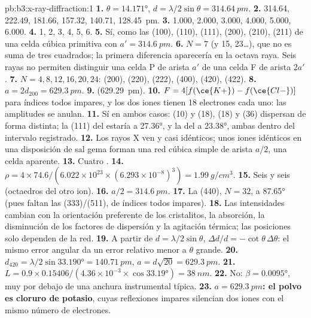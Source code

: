 \begin{solution}{pb:b3:x-ray-diffraction:1}
\textbf{1.} $\theta = \ang{14.171}$, $d = \lambda/2\sin\theta = \qty{314.64}{pm}$.
\textbf{2.} 314.64, 222.49, 181.66, 157.32, 140.71, \qty{128.45}{pm}.
\textbf{3.} 1.000, 2.000, 3.000, 4.000, 5.000, 6.000.
\textbf{4.} 1, 2, 3, 4, 5, 6.
\textbf{5.} Sí, como las (100), (110), (111), (200), (210), (211) de una celda cúbica primitiva
con $a' = \qty{314.6}{pm}$.
\textbf{6.} $N = 7$ (y 15, 23\dots), que no es suma de tres cuadrados; la
primera diferencia aparecería en la octava raya. Seis rayas no permiten distinguir una celda P
de arista $a'$ de una celda F de arista $2a'$.
\textbf{7.} $N = 4, 8, 12, 16, 20, 24$: (200), (220), (222), (400), (420), (422).
\textbf{8.} $a = 2d_{200} = \qty{629.3}{pm}$.
\textbf{9.}  (\qty{629.29}{pm}).
\textbf{10.} $F = 4[f(\ce{K+}) - f(\ce{Cl-})]$ para índices todos impares, y los dos iones tienen 18
electrones cada uno: las amplitudes se anulan.
\textbf{11.} Sí en ambos casos:  (10) y  (18),  (18) y  (36)
dispersan de forma distinta; la (111) del  estaría a \ang{27.36}, y la del  a \ang{23.38},
ambas dentro del intervalo registrado.
\textbf{12.} Los rayos X ven  y  casi idénticos; unos iones idénticos en una
disposición de sal gema forman una red cúbica simple de arista $a/2$, una celda aparente.
\textbf{13.} Cuatro .
\textbf{14.} $\rho = 4 \times 74.6/(6.022\times10^{23} \times (6.293\times10^{-8})^3) =
\qty{1.99}{g/cm^3}$.
\textbf{15.} Seis y seis (octaedros del otro ion).
\textbf{16.} $a/2 = \qty{314.6}{pm}$.
\textbf{17.} La (440), $N = 32$, a \ang{87.65} (pues faltan las (333)/(511), de índices todos impares).
\textbf{18.} Las intensidades cambian con la orientación preferente de los cristalitos,
la absorción, la disminución de los factores de dispersión y la agitación térmica; las posiciones
solo dependen de la red.
\textbf{19.} A partir de $d = \lambda/2\sin\theta$, $\Delta d/d = -\cot\theta\,\Delta\theta$: el mismo error angular
da un error relativo menor a $\theta$ grande.
\textbf{20.} $d_{420} = \lambda/2\sin\ang{33.190} = \qty{140.71}{pm}$, $a = d\sqrt{20} =
\qty{629.3}{pm}$.
\textbf{21.} $L = 0.9 \times 0.15406/(4.36\times10^{-3} \times \cos\ang{33.19}) = \qty{38}{nm}$.
\textbf{22.} No: $\beta = \ang{0.0095}$, muy por debajo de una anchura instrumental típica.
\textbf{23.} \textbf{$a = \qty{629.3}{pm}$: el polvo es cloruro de potasio}, cuyas reflexiones
impares silencian dos iones con el mismo número de electrones.
\end{solution}
